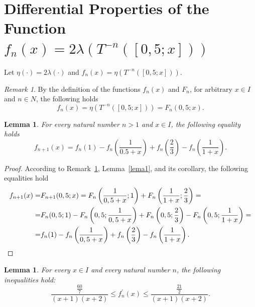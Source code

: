 \documentclass[11pt]{amsart}
\theoremstyle{plain}
\newtheorem{lemma}[theorem]{Lemma}
\theoremstyle{remark}
\newtheorem{remark}[theorem]{Remark}
\begin{document}
\section{Differential Properties of the Function $f_{n}(x)=2\lambda(T^{-n}([0,5;x]))$}
Let $\eta(\cdot)=2\lambda(\cdot)$ and $f_{n}(x)=\eta(T^{-n}([0,5;x]))$.
\begin{remark}\label{rem}
By the definition of the functions $f_n(x)$ and $F_n$, for arbitrary $x\in I$ and $n\in N$, the following holds
    \[f_n(x)=\eta(T^{-n}([0,5;x]))=F_n(0,5;x).\]
 \end{remark}
 \begin{lemma}\label{lemma:basic}
  For every natural number $n>1$ and $x\in I$, the following equality holds
      \begin{equation}\label{frec}
     f_{n+1}(x)=f_n(1)-f_n\left(\frac{1}{0.5+x}\right)+f_n\left(\frac{2}{3}\right)-f_n\left(\frac{1}{1+x}\right).
   \end{equation}
 \end{lemma}
 \begin{proof}
 According to Remark~\ref{rem}, Lemma~\ref{lema1}, and its corollary, the following equalities hold
    \begin{align*}
     f_{n+1}(x)=&F_{n+1}(0,5;x)=F_{n}\left(\frac{1}{0,5+x};1\right)+F_n\left(\frac{1}{1+x};\frac{2}{3}\right)=\\
     =&F_n(0,5;1)-F_n\left(0,5;\frac{1}{0,5+x}\right)+F_n\left(0,5;\frac{2}{3}\right)-F_n\left(0,5;\frac{1}{1+x}\right)=\\
     =&f_n(1)-f_n\left(\frac{1}{0,5+x}\right)+f_n\left(\frac{2}{3}\right)-f_n\left(\frac{1}{1+x}\right).\qedhere
   \end{align*}
 \end{proof}
\begin{lemma}\label{lema3}
  For every $x\in I$ and every natural number $n$, the following inequalities hold:
  $$
  \frac{\frac{60}{7}}{(x+1)(x+2)}\leq f_n^\prime(x)\leq \frac{\frac{21}{2}}{(x+1)(x+2)}.
  $$
\end{lemma}
\end{document}
